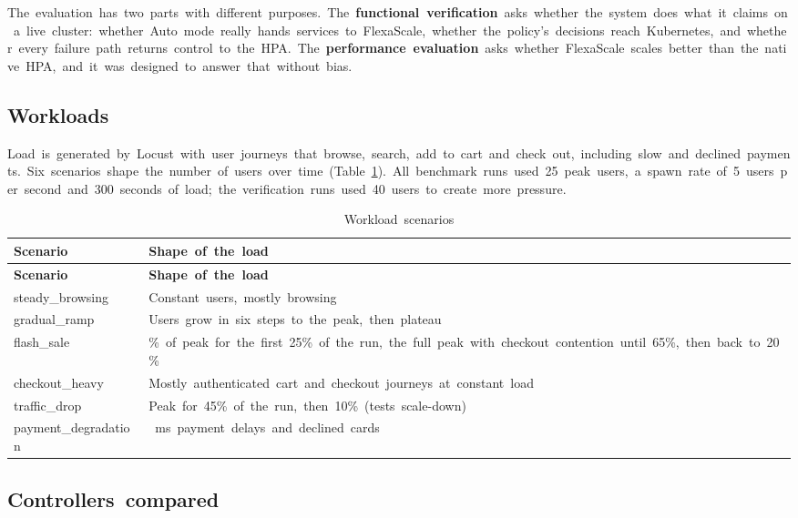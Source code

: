 \documentclass[12pt,a4paper,oneside]{report}
\begin{document}
The~evaluation~has~two~parts~with~different~purposes.~The~\textbf{functional~verification}~asks~whether~the~system~does~what~it~claims~on~a~live~cluster:~whether~Auto~mode~really~hands~services~to~FlexaScale,~whether~the~policy's~decisions~reach~Kubernetes,~and~whether~every~failure~path~returns~control~to~the~HPA.~The~\textbf{performance~evaluation}~asks~whether~FlexaScale~scales~better~than~the~native~HPA,~and~it~was~designed~to~answer~that~without~bias.


\subsection{Workloads}

Load~is~generated~by~Locust~with~user~journeys~that~browse,~search,~add~to~cart~and~check~out,~including~slow~and~declined~payments.~Six~scenarios~shape~the~number~of~users~over~time~(Table~\ref{tab:scenarios}).~All~benchmark~runs~used~25~peak~users,~a~spawn~rate~of~5~users~per~second~and~300~seconds~of~load;~the~verification~runs~used~40~users~to~create~more~pressure.


\begingroup\small\setlength{\tabcolsep}{4pt}\renewcommand{\arraystretch}{1.25}
\begin{longtable}{|>{\raggedright\arraybackslash}p{3.71cm}|>{\raggedright\arraybackslash}p{11.14cm}|}
\caption{Workload~scenarios}\label{tab:scenarios}\\\hline
\textbf{Scenario} & \textbf{Shape~of~the~load}\\\hline\endfirsthead
\hline \textbf{Scenario} & \textbf{Shape~of~the~load}\\\hline\endhead
steady\_browsing & Constant~users,~mostly~browsing\\\hline
gradual\_ramp & Users~grow~in~six~steps~to~the~peak,~then~plateau\\\hline
flash\_sale & 20\%~of~peak~for~the~first~25\%~of~the~run,~the~full~peak~with~checkout~contention~until~65\%,~then~back~to~20\%\\\hline
checkout\_heavy & Mostly~authenticated~cart~and~checkout~journeys~at~constant~load\\\hline
traffic\_drop & Peak~for~45\%~of~the~run,~then~10\%~(tests~scale-down)\\\hline
payment\_degradation & 300~ms~payment~delays~and~declined~cards\\\hline
\end{longtable}\endgroup

\subsection{Controllers~compared}
\end{document}

